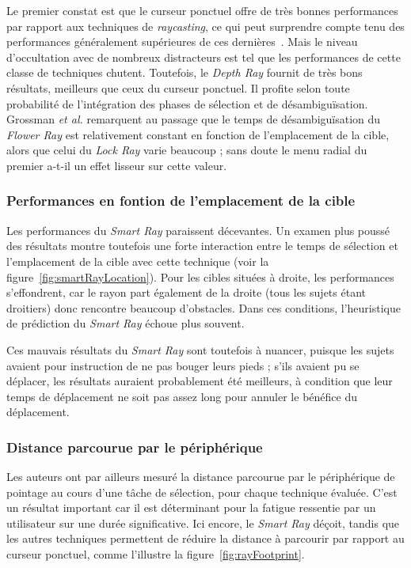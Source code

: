 	Le premier constat est que le curseur ponctuel offre de très bonnes performances par rapport aux techniques de \emph{raycasting}, ce qui peut surprendre compte tenu des performances généralement supérieures de ces dernières~\cite{bowman2001testbed}. Mais le niveau d'occultation avec de nombreux distracteurs est tel que les performances de cette classe de techniques chutent. Toutefois, le \emph{Depth Ray} fournit de très bons résultats, meilleurs que ceux du curseur ponctuel. Il profite selon toute probabilité de l'intégration des phases de sélection et de désambiguïsation. Grossman \emph{et al.} remarquent au passage que le temps de désambiguïsation du \emph{Flower Ray} est relativement constant en fonction de l'emplacement de la cible, alors que celui du \emph{Lock Ray} varie beaucoup ; sans doute le menu radial du premier a-t-il un effet lisseur sur cette valeur.

	\subsubsection{Performances en fontion de l'emplacement de la cible}
	Les performances du \emph{Smart Ray} paraissent décevantes. Un examen plus poussé des résultats montre toutefois une forte interaction entre le temps de sélection et l'emplacement de la cible avec cette technique (voir la figure~\ref{fig:smartRayLocation}). Pour les cibles situées à droite, les performances s'effondrent, car le rayon part également de la droite (tous les sujets étant droitiers) donc rencontre beaucoup d'obstacles. Dans ces conditions, l'heuristique de prédiction du \emph{Smart Ray} échoue plus souvent.

	Ces mauvais résultats du \emph{Smart Ray} sont toutefois à nuancer, puisque les sujets avaient pour instruction de ne pas bouger leurs pieds ; s'ils avaient pu se déplacer, les résultats auraient probablement été meilleurs, à condition que leur temps de déplacement ne soit pas assez long pour annuler le bénéfice du déplacement.
	
	\subsubsection{Distance parcourue par le périphérique}
	Les auteurs ont par ailleurs mesuré la distance parcourue par le périphérique de pointage au cours d'une tâche de sélection, pour chaque technique évaluée. C'est un résultat important car il est déterminant pour la fatigue ressentie par un utilisateur sur une durée significative. Ici encore, le \emph{Smart Ray} déçoit, tandis que les autres techniques permettent de réduire la distance à parcourir par rapport au curseur ponctuel, comme l'illustre la figure~\ref{fig:rayFootprint}.
	
